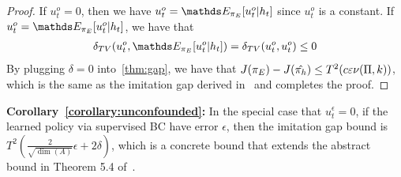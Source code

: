 \begin{proof}
If $u^o_t=0$, then we have $u^o_t=\expectE_{\pi_E}[u^o_t\lvert h_t]$ since $u^o_t$ is a constant. If $u^o_t=\expectE_{\pi_E}[u^o_t\lvert h_t]$, we have that 
\begin{align*}
\delta_{TV}(u^o_t,\expectE_{\pi_E}[u^o_t\lvert h_t])=\delta_{TV}(u^o_t,u^o_t)\leq 0
\end{align*}
By plugging $\delta=0$ into~\cref{thm:gap}, we have that $J(\pi_E)-J(\hat{\pi_h})\leq T^2(c\varepsilon\nu(\Pi,k))$, which is the same as the imitation gap derived in~\citet{Swamy2022_temporal} and completes the proof.
\end{proof}

\textbf{Corollary~\ref{corollary:unconfounded}:} In the special case that $u^\epsilon_t=0$, if the learned policy via supervised BC have error $\epsilon$, then the imitation gap bound is $T^2(\frac{2}{\sqrt{\dim(A)}}\epsilon+2\delta)$, which is a concrete bound that extends the abstract bound in Theorem 5.4 of~\citet{Swamy2022}.

